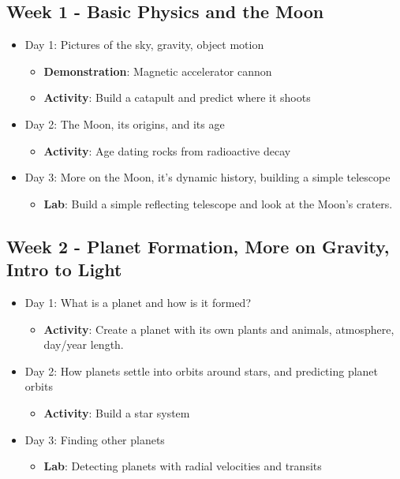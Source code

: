 \subsection*{Week 1 - Basic Physics and the Moon}
\begin{itemize}
\item Day 1: Pictures of the sky, gravity, object motion
	\begin{itemize}
	\item \textbf{Demonstration}: Magnetic accelerator cannon
	\item \textbf{Activity}: Build a catapult and predict where it shoots
	\end{itemize}
\item Day 2: The Moon, its origins, and its age
	\begin{itemize}
	\item \textbf{Activity}: Age dating rocks from radioactive decay
	\end{itemize}
\item Day 3: More on the Moon, it's dynamic history, building a simple telescope
	\begin{itemize}
	\item \textbf{Lab}: Build a simple reflecting telescope and look at the Moon's craters.
	\end{itemize}
\end{itemize}

\subsection*{Week 2 - Planet Formation, More on Gravity, Intro to Light}
\begin{itemize}
\item Day 1: What is a planet and how is it formed?
	\begin{itemize}
	\item \textbf{Activity}: Create a planet with its own plants and animals, atmosphere, day/year length.
	\end{itemize}
\item Day 2: How planets settle into orbits around stars, and predicting planet orbits
	\begin{itemize}
	\item \textbf{Activity}: Build a star system
	\end{itemize}
\item Day 3: Finding other planets
	\begin{itemize}
	\item \textbf{Lab}: Detecting planets with radial velocities and transits
	\end{itemize}
\end{itemize}


